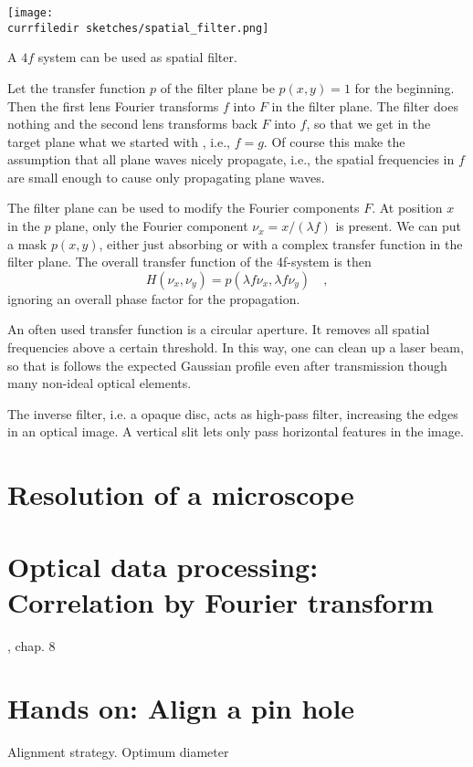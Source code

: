 \begin{marginfigure}
    \texttt{[image: \\currfiledir sketches/spatial\_filter.png]}
    \caption{A $4f$ system can be used as spatial filter.}
\end{marginfigure}

Let the transfer function $p$ of the filter plane be $p(x,y)=1$ for the beginning. Then the first lens Fourier transforms $f$ into $F$ in the filter plane. The filter does nothing and the second lens transforms back $F$ into $f$, so that we get in the target plane what we started with , i.e., $f=g$. Of course this make the assumption that all plane waves nicely propagate, i.e., the spatial frequencies in $f$ are small enough to cause only propagating plane waves.

The filter plane can be used to modify the Fourier components $F$. At position $x$ in the $p$ plane, only the Fourier component $\nu_x = x / (\lambda f)$ is present. We can put a mask $p(x,y)$, either just absorbing or with a complex transfer function in the filter plane. The overall transfer function of the 4f-system is then
\begin{equation}
    H(\nu_x, \nu_y) = p (\lambda f \nu_x, \lambda f \nu_y) \quad , 
\end{equation}
ignoring an overall phase factor for the propagation. 

An often used transfer function is a circular aperture. It removes all spatial frequencies above a certain threshold. In this way, one can clean up a laser beam, so that is follows the expected Gaussian profile even after transmission though many non-ideal optical elements.

The inverse filter, i.e. a opaque disc, acts as high-pass filter, increasing the edges in an optical image. A vertical slit lets only pass horizontal features in the image.



\section{Resolution of a microscope}

\section {Optical data processing: Correlation by Fourier transform }

\cite{Goodman2005}, chap. 8


\section{Hands on: Align  a pin hole}

Alignment strategy. Optimum diameter


\printbibliography[segment=\therefsegment,heading=subbibliography]
